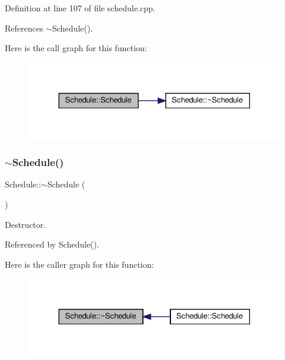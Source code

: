 Definition at line 107 of file schedule.\+cpp.



References $\sim$\+Schedule().

Here is the call graph for this function\+:
\nopagebreak
\begin{figure}[H]
\begin{center}
\leavevmode
\includegraphics[width=330pt]{df/d61/classSchedule_a245be13feb696aef57541ec19dcb5c5a_cgraph}
\end{center}
\end{figure}
\mbox{\label{classSchedule_a4806b985197d35c00b9e707c0ed87998}} 
\subsubsection{\texorpdfstring{$\sim$\+Schedule()}{~Schedule()}}
{\footnotesize\ttfamily Schedule\+::$\sim$\+Schedule (\begin{DoxyParamCaption}{ }\end{DoxyParamCaption})\hspace{0.3cm}{\ttfamily [default]}}



Destructor. 



Referenced by Schedule().

Here is the caller graph for this function\+:
\nopagebreak
\begin{figure}[H]
\begin{center}
\leavevmode
\includegraphics[width=330pt]{df/d61/classSchedule_a4806b985197d35c00b9e707c0ed87998_icgraph}
\end{center}
\end{figure}


